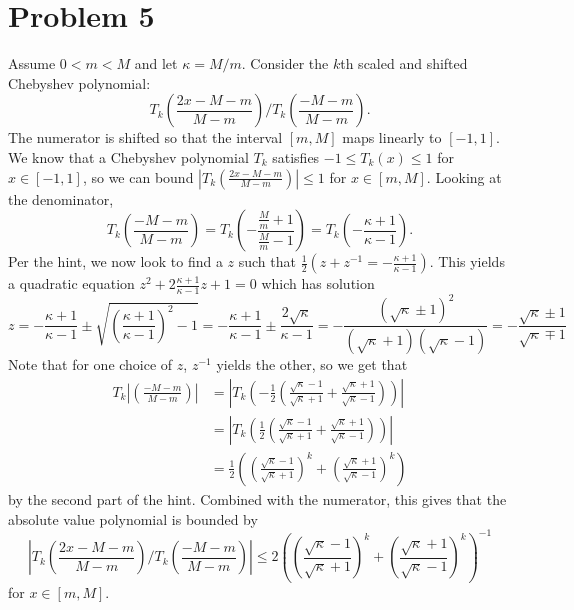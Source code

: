 \documentclass{article}
\begin{document}
\section{Problem 5}
Assume $0 < m < M$ and let $\kappa = M/m$.  Consider the $k$th scaled and shifted
Chebyshev polynomial:
\begin{equation*}
T_k \left( \frac{2x - M - m}{M - m} \right) / T_k \left( \frac{-M-m}{M-m} \right) .
\end{equation*}
The numerator is shifted so that the interval $[m,M]$ maps linearly to $[-1,1]$. We know that a Chebyshev polynomial $T_k$ satisfies $-1\leq T_k(x)\leq1$ for $x\in[-1,1]$, so we can bound $\left|T_k \left( \frac{2x - M - m}{M - m} \right)\right|\leq1$ for $x\in[m,M]$. Looking at the denominator,
\[
T_k \left( \frac{-M-m}{M-m} \right)=T_k \left( -\frac{\frac{M}{m}+1}{\frac{M}{m}-1} \right)=T_k \left(- \frac{\kappa+1}{\kappa-1} \right).
\]
Per the hint, we now look to find a $z$ such that $\frac{1}{2}(z+z^{-1}=- \frac{\kappa+1}{\kappa-1})$. This yields a quadratic equation $z^2+2\frac{\kappa+1}{\kappa-1}z+1=0$ which has solution
\[
z=-\frac{\kappa+1}{\kappa-1}\pm\sqrt{\left(\frac{\kappa+1}{\kappa-1}\right)^2-1}=-\frac{\kappa+1}{\kappa-1}\pm\frac{2\sqrt{\kappa}}{\kappa-1}=-\frac{(\sqrt{\kappa}\pm1)^2}{(\sqrt{\kappa}+1)(\sqrt{\kappa}-1)}=-\frac{\sqrt{\kappa}\pm1}{\sqrt{\kappa}\mp1}
\]
Note that for one choice of $z$, $z^{-1}$ yields the other, so we get that 
\begin{align*}
T_k \left|\left( \frac{-M-m}{M-m} \right)\right|&=\left|T_k \left(- \frac{1}{2}\left(\frac{\sqrt{\kappa}-1}{\sqrt{\kappa}+1}+\frac{\sqrt{\kappa}+1}{\sqrt{\kappa}-1}\right) \right)\right|\\&=\left|T_k \left( \frac{1}{2}\left(\frac{\sqrt{\kappa}-1}{\sqrt{\kappa}+1}+\frac{\sqrt{\kappa}+1}{\sqrt{\kappa}-1}\right) \right)\right|\\&=
\frac{1}{2}\left(\left(\frac{\sqrt{\kappa}-1}{\sqrt{\kappa}+1}\right)^k+\left(\frac{\sqrt{\kappa}+1}{\sqrt{\kappa}-1}\right)^k\right)
\end{align*}
by the second part of the hint. Combined with the numerator, this gives that the absolute value polynomial is bounded by 
\[
\left|T_k \left( \frac{2x - M - m}{M - m} \right) / T_k \left( \frac{-M-m}{M-m} \right)\right|\leq  2\left(\left(\frac{\sqrt{\kappa}-1}{\sqrt{\kappa}+1}\right)^k+\left(\frac{\sqrt{\kappa}+1}{\sqrt{\kappa}-1}\right)^k\right)^{-1}
\]
for $x\in[m,M]$.
\end{document}
